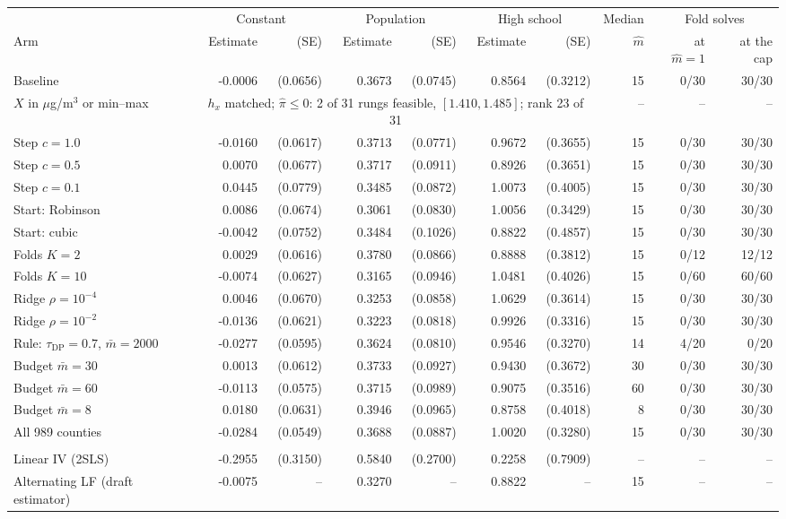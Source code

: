 \begin{tabular}{lrrrrrrrrr}
\toprule
& \multicolumn{2}{c}{Constant} & \multicolumn{2}{c}{Population} & \multicolumn{2}{c}{High school} & Median & \multicolumn{2}{c}{Fold solves} \\
\cmidrule(lr){2-3} \cmidrule(lr){4-5} \cmidrule(lr){6-7} \cmidrule(lr){9-10}
Arm & Estimate & (SE) & Estimate & (SE) & Estimate & (SE) & $\hat m$ & at $\hat m = 1$ & at the cap \\
\midrule
Baseline & -0.0006 & (0.0656) & 0.3673 & (0.0745) & 0.8564 & (0.3212) & 15 & 0/30 & 30/30 \\
$X$ in $\mu$g/m$^3$ or min--max & \multicolumn{6}{c}{$h_x$ matched; $\hat\pi \leq 0$: 2 of 31 rungs feasible, $[1.410, 1.485]$; rank 23 of 31} & -- & -- & -- \\
Step $c = 1.0$ & -0.0160 & (0.0617) & 0.3713 & (0.0771) & 0.9672 & (0.3655) & 15 & 0/30 & 30/30 \\
Step $c = 0.5$ & 0.0070 & (0.0677) & 0.3717 & (0.0911) & 0.8926 & (0.3651) & 15 & 0/30 & 30/30 \\
Step $c = 0.1$ & 0.0445 & (0.0779) & 0.3485 & (0.0872) & 1.0073 & (0.4005) & 15 & 0/30 & 30/30 \\
Start: Robinson & 0.0086 & (0.0674) & 0.3061 & (0.0830) & 1.0056 & (0.3429) & 15 & 0/30 & 30/30 \\
Start: cubic & -0.0042 & (0.0752) & 0.3484 & (0.1026) & 0.8822 & (0.4857) & 15 & 0/30 & 30/30 \\
Folds $K = 2$ & 0.0029 & (0.0616) & 0.3780 & (0.0866) & 0.8888 & (0.3812) & 15 & 0/12 & 12/12 \\
Folds $K = 10$ & -0.0074 & (0.0627) & 0.3165 & (0.0946) & 1.0481 & (0.4026) & 15 & 0/60 & 60/60 \\
Ridge $\rho = 10^{-4}$ & 0.0046 & (0.0670) & 0.3253 & (0.0858) & 1.0629 & (0.3614) & 15 & 0/30 & 30/30 \\
Ridge $\rho = 10^{-2}$ & -0.0136 & (0.0621) & 0.3223 & (0.0818) & 0.9926 & (0.3316) & 15 & 0/30 & 30/30 \\
Rule: $\tau_{\mathrm{DP}} = 0.7$, $\bar m = 2000$ & -0.0277 & (0.0595) & 0.3624 & (0.0810) & 0.9546 & (0.3270) & 14 & 4/20 & 0/20 \\
Budget $\bar m = 30$ & 0.0013 & (0.0612) & 0.3733 & (0.0927) & 0.9430 & (0.3672) & 30 & 0/30 & 30/30 \\
Budget $\bar m = 60$ & -0.0113 & (0.0575) & 0.3715 & (0.0989) & 0.9075 & (0.3516) & 60 & 0/30 & 30/30 \\
Budget $\bar m = 8$ & 0.0180 & (0.0631) & 0.3946 & (0.0965) & 0.8758 & (0.4018) & 8 & 0/30 & 30/30 \\
All 989 counties & -0.0284 & (0.0549) & 0.3688 & (0.0887) & 1.0020 & (0.3280) & 15 & 0/30 & 30/30 \\
\addlinespace
\multicolumn{10}{l}{\textit{Comparison estimators}} \\
Linear IV (2SLS) & -0.2955 & (0.3150) & 0.5840 & (0.2700) & 0.2258 & (0.7909) & -- & -- & -- \\
Alternating LF (draft estimator) & -0.0075 & -- & 0.3270 & -- & 0.8822 & -- & 15 & -- & -- \\
\bottomrule
\end{tabular}
